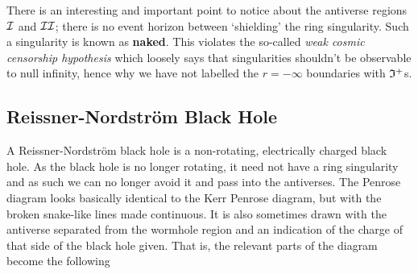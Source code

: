 There is an interesting and important point to notice about the antiverse regions $\mathcal{I}$ and $\mathcal{I}\mathcal{I}$; there is no event horizon between `shielding' the ring singularity. Such a singularity is known as \textbf{naked}. This violates the so-called \textit{weak cosmic censorship hypothesis} which loosely says that singularities shouldn't be observable to null infinity, hence why we have not labelled the $r=-\infty$ boundaries with $\mathfrak{I}^+$s.

\subsection{Reissner-Nordstr\"{o}m Black Hole}

A Reissner-Nordstr\"{o}m black hole is a non-rotating, electrically charged black hole. As the black hole is no longer rotating, it need not have a ring singularity and as such we can no longer avoid it and pass into the antiverses. The Penrose diagram looks basically identical to the Kerr Penrose diagram, but with the broken snake-like lines made continuous. It is also sometimes drawn with the antiverse separated from the wormhole region and an indication of the charge of that side of the black hole given. That is, the relevant parts of the diagram become the following 


